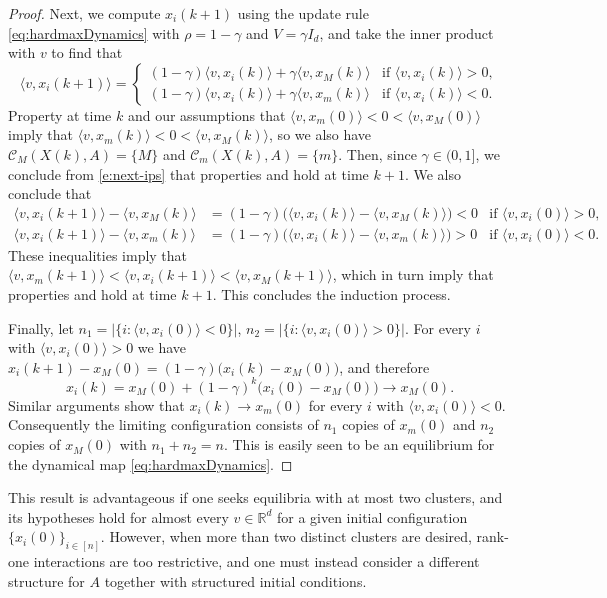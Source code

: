 \documentclass[pdflatex,sn-mathphys-num]{sn-jnl}%
\theoremstyle{thmstyleone}%
\theoremstyle{thmstyletwo}%
\theoremstyle{thmstylethree}%
\numberwithin{equation}{section}
\newcommand{\R}{\mathbb{R}}
\begin{document}
\begin{proof}
Next, we compute $x_i(k+1)$ using the update rule \eqref{eq:hardmaxDynamics} with $\rho=1-\gamma$ and $V=\gamma I_d$, and take the inner product with $v$ to find that
\begin{equation}\label{e:next-ips}
\langle v, x_i(k+1)\rangle =
\begin{cases}
(1-\gamma)\langle v, x_i(k)\rangle + \gamma \langle v, x_M(k)\rangle
& \text{if }\langle v, x_i(k)\rangle>0,\\
(1-\gamma)\langle v, x_i(k)\rangle + \gamma \langle v, x_m(k)\rangle
& \text{if }\langle v, x_i(k)\rangle<0.
\end{cases}
\end{equation}
Property  at time $k$ and our assumptions that $\langle v,x_m(0)\rangle < 0 < \langle v,x_M(0)\rangle$ imply that $\langle v,x_m(k)\rangle < 0 < \langle v,x_M(k)\rangle$, so we also have $\mathcal C_M(X(k),A)=\{M\}$ and $\mathcal C_m(X(k),A)=\{m\}$. Then, since $\gamma \in (0,1]$, we conclude from \cref{e:next-ips} that properties  and  hold at time $k+1$. We also conclude that
\begin{align*}
\langle v,x_i(k+1)\rangle-\langle v,x_M(k)\rangle
&=(1-\gamma)\bigl(\langle v,x_i(k)\rangle-\langle v,x_M(k)\rangle\bigr) <0&\text{if }\langle v,x_i(0)\rangle>0,
\\
\langle v,x_i(k+1)\rangle-\langle v,x_m(k)\rangle
&=(1-\gamma)\bigl(\langle v,x_i(k)\rangle-\langle v,x_m(k)\rangle\bigr)>0
&\text{if }\langle v,x_i(0)\rangle<0.
\end{align*}
These inequalities imply that $\langle v,x_m(k+1)\rangle < \langle v,x_i(k+1)\rangle <\langle v,x_M(k+1)\rangle$, which in turn imply that properties  and  hold at time $k+1$. This concludes the induction process.

Finally, let $n_1 = \bigl|\{i:\langle v,x_i(0)\rangle<0\}\bigr|$, $n_2 = \bigl|\{i:\langle v,x_i(0)\rangle>0\}\bigr|$. For every $i$ with $\langle v,x_i(0)\rangle>0$ we have
$x_i(k+1)-x_M(0)=(1-\gamma)\bigl(x_i(k)-x_M(0)\bigr)$,
and therefore
\[
x_i(k)=x_M(0)+(1-\gamma)^k\bigl(x_i(0)-x_M(0)\bigr)\to x_M(0).
\]
Similar arguments show that $x_i(k)\to x_m(0)$ for every $i$ with $\langle v,x_i(0)\rangle<0$. 
Consequently the limiting configuration consists of $n_1$ copies of $x_m(0)$ and $n_2$ copies of $x_M(0)$ with $n_1+n_2=n$. This is easily seen to be an equilibrium for the dynamical map \cref{eq:hardmaxDynamics}.
\end{proof}
%
This result is advantageous if one seeks equilibria with at most two clusters, and its hypotheses hold for almost every $v\in \R^d$ for a given initial configuration $\{x_i(0)\}_{i\in [n]}$. However, when more than two distinct clusters are desired, rank-one interactions are too restrictive, and one must instead consider a different structure for $A$ together with structured initial conditions. 
\end{document}
